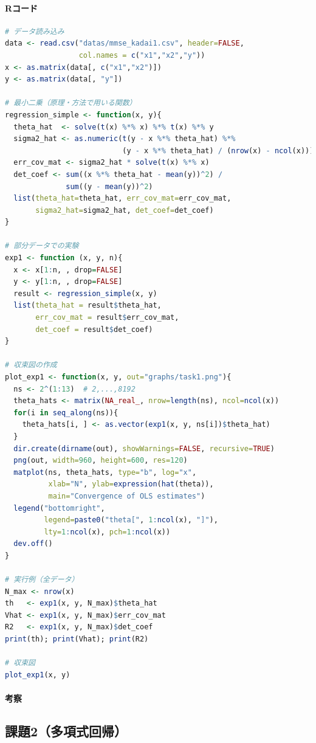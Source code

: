 \paragraph{Rコード}
\begin{lstlisting}[language=R]
# データ読み込み
data <- read.csv("datas/mmse_kadai1.csv", header=FALSE,
                 col.names = c("x1","x2","y"))
x <- as.matrix(data[, c("x1","x2")])
y <- as.matrix(data[, "y"])

# 最小二乗（原理・方法で用いる関数）
regression_simple <- function(x, y){
  theta_hat  <- solve(t(x) %*% x) %*% t(x) %*% y
  sigma2_hat <- as.numeric(t(y - x %*% theta_hat) %*%
                           (y - x %*% theta_hat) / (nrow(x) - ncol(x)))
  err_cov_mat <- sigma2_hat * solve(t(x) %*% x)
  det_coef <- sum((x %*% theta_hat - mean(y))^2) /
              sum((y - mean(y))^2)
  list(theta_hat=theta_hat, err_cov_mat=err_cov_mat,
       sigma2_hat=sigma2_hat, det_coef=det_coef)
}

# 部分データでの実験
exp1 <- function (x, y, n){
  x <- x[1:n, , drop=FALSE]
  y <- y[1:n, , drop=FALSE]
  result <- regression_simple(x, y)
  list(theta_hat = result$theta_hat,
       err_cov_mat = result$err_cov_mat,
       det_coef = result$det_coef)
}

# 収束図の作成
plot_exp1 <- function(x, y, out="graphs/task1.png"){
  ns <- 2^(1:13)  # 2,...,8192
  theta_hats <- matrix(NA_real_, nrow=length(ns), ncol=ncol(x))
  for(i in seq_along(ns)){
    theta_hats[i, ] <- as.vector(exp1(x, y, ns[i])$theta_hat)
  }
  dir.create(dirname(out), showWarnings=FALSE, recursive=TRUE)
  png(out, width=960, height=600, res=120)
  matplot(ns, theta_hats, type="b", log="x",
          xlab="N", ylab=expression(hat(theta)),
          main="Convergence of OLS estimates")
  legend("bottomright",
         legend=paste0("theta[", 1:ncol(x), "]"),
         lty=1:ncol(x), pch=1:ncol(x))
  dev.off()
}

# 実行例（全データ）
N_max <- nrow(x)
th   <- exp1(x, y, N_max)$theta_hat
Vhat <- exp1(x, y, N_max)$err_cov_mat
R2   <- exp1(x, y, N_max)$det_coef
print(th); print(Vhat); print(R2)

# 収束図
plot_exp1(x, y)
\end{lstlisting}

\paragraph {考察}


\subsection{課題2（多項式回帰）}

